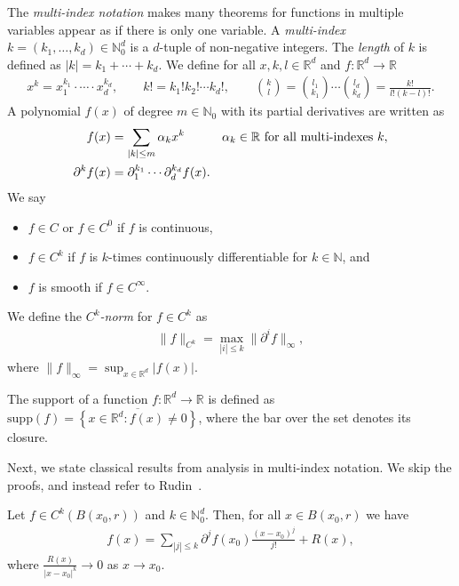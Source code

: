 The \emph{multi-index notation} makes many theorems for functions in multiple variables appear as if there is only one variable. A \emph{multi-index} \(k = (k_1, \ldots ,k_d) \in \mathbb{N}^d_0\) is a \(d\)-tuple of non-negative integers. The \emph{length} of \(k\) is defined as \(|k| = k_1 + \cdots + k_d\). We define for all \(x, k,l \in \mathbb{R}^d\) and \(f: \mathbb{R}^d \to \mathbb{R}\)
\begin{gather*}
    x^k = x_1^{k_1} \cdot \cdots \cdot x_d^{k_d}, \qquad
    k! = k_1! k_2! \cdots k_d!, \qquad
    \binom{k}{l} = \binom{l_1}{k_1} \cdots \binom{l_d}{k_d} = \frac{k!}{l! (k - l)!}.
\end{gather*}
A polynomial \(f(x)\) of degree \(m \in \mathbb{N}_0\) with its partial derivatives are written as 
\begin{align*}
    f(x) &= \sum\limits_{|k| \leq m} \alpha_{k}x^k \qquad \quad \alpha_k \in \mathbb{R}  \text{ for all multi-indexes \( k \)} ,\\
    \partial^k f(x) &= \partial^{k_1}_{1} \cdots \partial^{k_d}_{d} f(x).
\end{align*}
We say 
\begin{itemize}
    \item \(f \in C\) or \(f \in C^0\) if \(f\) is continuous,
    \item \(f \in C^k\) if \(f\) is {\(k\)-times continuously differentiable} for \(k \in \mathbb{N}\), and
    \item \(f\) is {smooth} if \( f \in C^\infty \).
\end{itemize}
We define the \emph{\(C^k\)-norm} for \( f \in {C}^k \) as 
\begin{align*}
    \lVert f \rVert_{C^k} = \max\limits_{|i| \leq k} \lVert \partial^i f \rVert_{\infty},
\end{align*}
where \(\lVert f \rVert_{\infty} = \sup_{x \in \mathbb{R}^d} |f(x)|\). 

The {support} of a function \(f: \mathbb{R}^d \to \mathbb{R}\) is defined as \(\mathrm{supp}(f) = \overline{\left \{ x \in \mathbb{R}^d : f(x) \neq 0 \right \}}\), where the bar over the set denotes its closure.

Next, we state classical results from analysis in multi-index notation. We skip the proofs, and instead refer to Rudin~\cite{MR0055409}.
\begin{theorem}
    Let \(f \in C^{k}(B(x_0, r))\) and \(k \in \mathbb{N}^d_0\). Then, for all \(x \in B(x_0, r)\) we have
    \begin{align*}
        f(x) = \sum\limits_{|j| \leq k}\partial^{j} f(x_0) \frac{{(x-x_0)}^j}{j!} + R(x),
    \end{align*}
    where \(\frac{R(x)}{|x-x_0|^{k}} \to 0\) as \(x \to x_0\).
\end{theorem}

